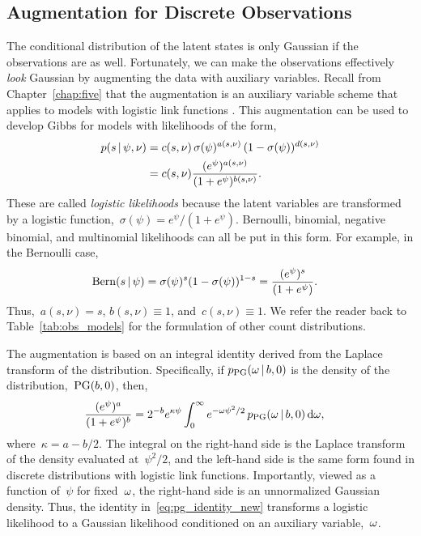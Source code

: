 \subsection{\polyagamma Augmentation for Discrete Observations}
The conditional distribution of the latent states is only Gaussian
if the observations are as well. Fortunately, we can make the
observations effectively \emph{look} Gaussian by augmenting the
data with \polyagamma auxiliary variables. 
Recall from Chapter~\ref{chap:five} that the \polyagamma augmentation
is an auxiliary variable scheme that applies to models with logistic
link functions \citep{polson2013bayesian}.  This augmentation can be
used to develop Gibbs for models with likelihoods of the form,
\begin{align*}
  \nonumber  p(s \,|\, \psi, \nu)
  &= c(s, \nu) \, \sigma(\psi)^{a(s, \nu)} \,
  (1-\sigma(\psi))^{d(s, \nu)} \\
  &= c(s, \nu)
  \frac{(e^{\psi})^{a(s, \nu)}}
       {(1+e^{\psi})^{b(s, \nu)}}.
\end{align*}
These are called \emph{logistic likelihoods} because the latent
variables are transformed by a logistic
function,~${\sigma(\psi)=e^\psi /(1+e^\psi)}$.  Bernoulli, binomial,
negative binomial, and multinomial likelihoods can all be put in this
form.  For example, in the Bernoulli
case,
\begin{align*}
  \mathrm{Bern}(s \,|\, \psi) 
  &= \sigma(\psi)^{s}
    (1-\sigma(\psi))^{1-s}
  = \frac{(e^{\psi})^{s}}
       {(1+e^{\psi})}.
\end{align*}
Thus,~${a(s, \nu) = s}$,
${b(s,\nu) \equiv 1}$, and~${c(s, \nu) \equiv 1}$.
We refer the reader back to Table~\ref{tab:obs_models} for the formulation of
other count distributions.

The augmentation is based on an integral identity
derived from the Laplace transform of the \polyagamma distribution.
Specifically, if $p_{\mathrm{PG}}({\omega}\,|\, b, 0)$ is the
density of the \polyagamma distribution,~${\mathrm{PG}(b, 0)}$,
then,
\begin{align}
  \frac{(e^{\psi})^a}{(1+e^{\psi})^b}
  &= 2^{-b} e^{\kappa \psi}
  \int_{0}^{\infty} e^{-{\omega} \psi^2 /2} \,
  p_{\mathrm{PG}}({\omega} \,|\, b, 0) \, \mathrm{d}{\omega},
\label{eq:pg_identity_new}
\end{align}
where~${\kappa=a-b/2}$. The integral on the right-hand side is the
Laplace transform of the \polyagamma density evaluated at~$\psi^2/2$,
and the left-hand side is the same form found in discrete
distributions with logistic link functions.  Importantly, viewed as a
function of~$\psi$ for fixed~${\omega}$, the right-hand side is an
unnormalized Gaussian density.  Thus, the identity
in~\eqref{eq:pg_identity_new} transforms a logistic likelihood to a
Gaussian likelihood conditioned on an auxiliary variable,~${\omega}$.

